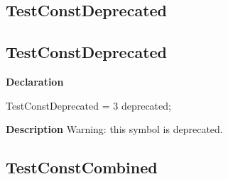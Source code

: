 \documentclass{report}
\newif\ifpdf
\begin{document}
\subsection*{\large{\textbf{TestConstDeprecated}}\normalsize\hspace{1ex}\hrulefill}
\else
\subsection*{TestConstDeprecated}
\fi
\label{ok_hint_directives-TestConstDeprecated}
\begin{list}{}{
\setlength{\itemindent}{0cm}
\setlength{\listparindent}{0cm}
\setlength{\leftmargin}{\evensidemargin}
\addtolength{\leftmargin}{\tmplength}
\settowidth{\labelsep}{X}
\addtolength{\leftmargin}{\labelsep}
\setlength{\labelwidth}{\tmplength}
}
\item[\textbf{Declaration}\hfill]
\ifpdf
\begin{flushleft}
\fi
\begin{ttfamily}
TestConstDeprecated = 3 deprecated;\end{ttfamily}

\ifpdf
\end{flushleft}
\fi

\par
\item[\textbf{Description}]
Warning: this symbol is deprecated.

 

\end{list}
\ifpdf
\subsection*{\large{\textbf{TestConstCombined}}\normalsize\hspace{1ex}\hrulefill}
\else
\end{document}
